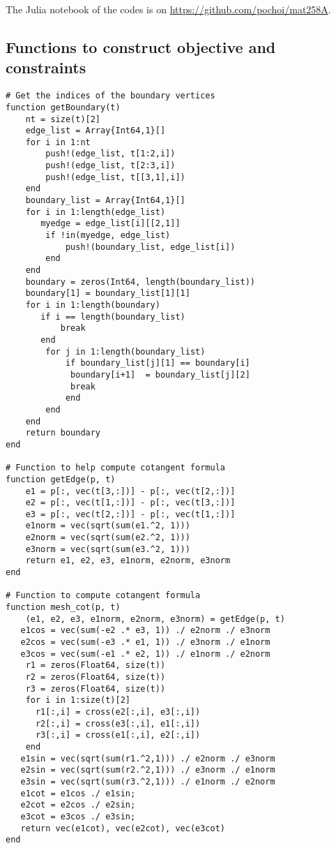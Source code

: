 \documentclass{article} %
\begin{document}
The Julia notebook of the codes is on \url{https://github.com/pochoi/mat258A}.

\subsection{Functions to construct objective and constraints}
\begin{lstlisting}
# Get the indices of the boundary vertices
function getBoundary(t)
    nt = size(t)[2]
    edge_list = Array{Int64,1}[]
    for i in 1:nt
        push!(edge_list, t[1:2,i])
        push!(edge_list, t[2:3,i])
        push!(edge_list, t[[3,1],i])
    end
    boundary_list = Array{Int64,1}[]
    for i in 1:length(edge_list)
       myedge = edge_list[i][[2,1]]
        if !in(myedge, edge_list)
            push!(boundary_list, edge_list[i])
        end
    end 
    boundary = zeros(Int64, length(boundary_list))
    boundary[1] = boundary_list[1][1]
    for i in 1:length(boundary)
       if i == length(boundary_list) 
           break
       end
        for j in 1:length(boundary_list)
            if boundary_list[j][1] == boundary[i]
             boundary[i+1]  = boundary_list[j][2]
             break
            end
        end
    end
    return boundary
end

# Function to help compute cotangent formula
function getEdge(p, t)
    e1 = p[:, vec(t[3,:])] - p[:, vec(t[2,:])]
    e2 = p[:, vec(t[1,:])] - p[:, vec(t[3,:])]
    e3 = p[:, vec(t[2,:])] - p[:, vec(t[1,:])]
    e1norm = vec(sqrt(sum(e1.^2, 1)))
    e2norm = vec(sqrt(sum(e2.^2, 1)))
    e3norm = vec(sqrt(sum(e3.^2, 1)))
    return e1, e2, e3, e1norm, e2norm, e3norm
end

# Function to compute cotangent formula
function mesh_cot(p, t)
    (e1, e2, e3, e1norm, e2norm, e3norm) = getEdge(p, t)
   e1cos = vec(sum(-e2 .* e3, 1)) ./ e2norm ./ e3norm
   e2cos = vec(sum(-e3 .* e1, 1)) ./ e3norm ./ e1norm
   e3cos = vec(sum(-e1 .* e2, 1)) ./ e1norm ./ e2norm
    r1 = zeros(Float64, size(t)) 
    r2 = zeros(Float64, size(t)) 
    r3 = zeros(Float64, size(t)) 
    for i in 1:size(t)[2]
      r1[:,i] = cross(e2[:,i], e3[:,i])  
      r2[:,i] = cross(e3[:,i], e1[:,i])  
      r3[:,i] = cross(e1[:,i], e2[:,i])  
    end
   e1sin = vec(sqrt(sum(r1.^2,1))) ./ e2norm ./ e3norm
   e2sin = vec(sqrt(sum(r2.^2,1))) ./ e3norm ./ e1norm
   e3sin = vec(sqrt(sum(r3.^2,1))) ./ e1norm ./ e2norm
   e1cot = e1cos ./ e1sin;
   e2cot = e2cos ./ e2sin;
   e3cot = e3cos ./ e3sin;
   return vec(e1cot), vec(e2cot), vec(e3cot)
end


\end{lstlisting}
\end{document}

